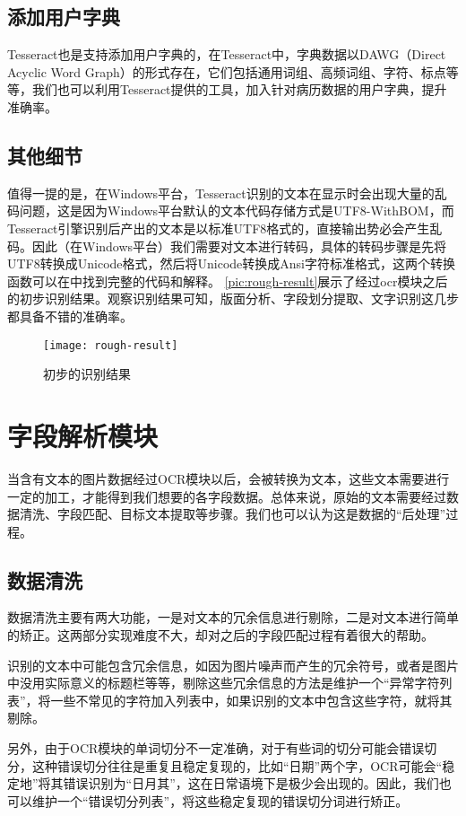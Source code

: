 \subsection{添加用户字典}
Tesseract也是支持添加用户字典的，在Tesseract中，字典数据以DAWG（Direct Acyclic Word Graph）的形式存在，它们包括通用词组、高频词组、字符、标点等等，我们也可以利用Tesseract提供的工具，加入针对病历数据的用户字典，提升准确率。

\subsection{其他细节}
值得一提的是，在Windows平台，Tesseract识别的文本在显示时会出现大量的乱码问题，这是因为Windows平台默认的文本代码存储方式是UTF8-WithBOM，而Tesseract引擎识别后产出的文本是以标准UTF8格式的，直接输出势必会产生乱码。因此（在Windows平台）我们需要对文本进行转码，具体的转码步骤是先将UTF8转换成Unicode格式，然后将Unicode转换成Ansi字符标准格式，这两个转换函数可以在\citep{character-encoding}中找到完整的代码和解释。
\autoref{pic:rough-result}展示了经过ocr模块之后的初步识别结果。观察识别结果可知，版面分析、字段划分提取、文字识别这几步都具备不错的准确率。
\begin{figure}[htbp]
	\centering
	\caption{初步的识别结果}
	\texttt{[image: rough-result]}
	\label{pic:rough-result}
\end{figure}

\section{字段解析模块}  %
当含有文本的图片数据经过OCR模块以后，会被转换为文本，这些文本需要进行一定的加工，才能得到我们想要的各字段数据。总体来说，原始的文本需要经过数据清洗、字段匹配、目标文本提取等步骤。我们也可以认为这是数据的“后处理”过程。

\subsection{数据清洗}
数据清洗主要有两大功能，一是对文本的冗余信息进行剔除，二是对文本进行简单的矫正。这两部分实现难度不大，却对之后的字段匹配过程有着很大的帮助。

识别的文本中可能包含冗余信息，如因为图片噪声而产生的冗余符号，或者是图片中没用实际意义的标题栏等等，剔除这些冗余信息的方法是维护一个“异常字符列表”，将一些不常见的字符加入列表中，如果识别的文本中包含这些字符，就将其剔除。

另外，由于OCR模块的单词切分不一定准确，对于有些词的切分可能会错误切分，这种错误切分往往是重复且稳定复现的，比如“日期”两个字，OCR可能会“稳定地”将其错误识别为“日月其”，这在日常语境下是极少会出现的。因此，我们也可以维护一个“错误切分列表”，将这些稳定复现的错误切分词进行矫正。

